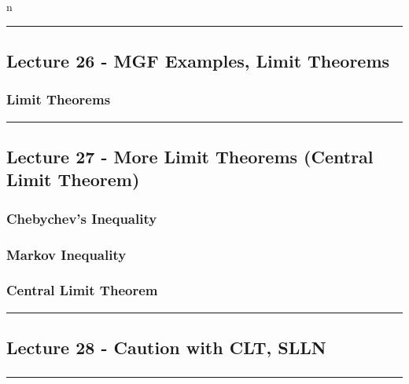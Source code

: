 n\documentclass{article}
\begin{document}
\medskip\hrule
\subsection{Lecture 26 - MGF Examples, Limit Theorems}

\subsubsection{Limit Theorems}


\medskip\hrule
\subsection{Lecture 27 - More Limit Theorems (Central Limit Theorem)}

\subsubsection{Chebychev's Inequality}

\subsubsection{Markov Inequality}

\subsubsection{Central Limit Theorem}


\medskip\hrule
\subsection{Lecture 28 - Caution with CLT, SLLN}

\subsubsection{}

\medskip\hrule
\end{document}
